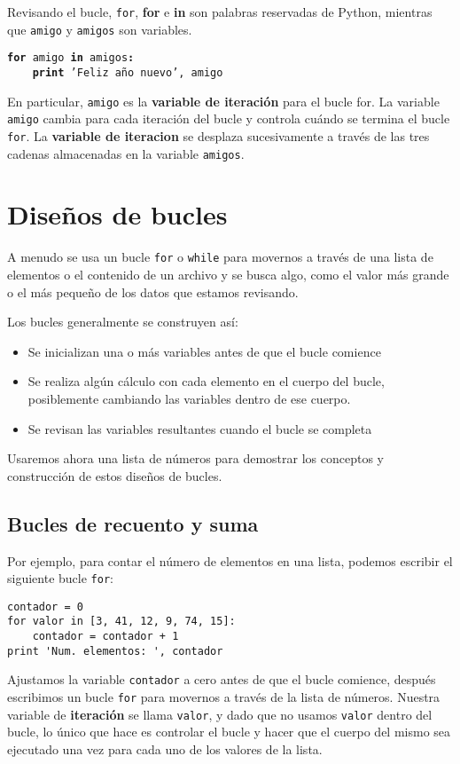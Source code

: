 Revisando el bucle, {\tt for}, {\bf for} e {\bf in} son palabras
reservadas de Python, mientras que {\tt amigo} y {\tt amigos} son variables.

{\tt {\bf for} amigo {\bf in} amigos{\bf :}\\
\verb"    "{\bf print} 'Feliz año nuevo', amigo }

En particular, {\tt amigo} es la {\bf variable de iteración} para
el bucle for. La variable {\tt amigo} cambia para cada iteración del
bucle y controla cuándo se termina el bucle {\tt for}. La
{\bf variable de iteracion} se desplaza sucesivamente a través de
las tres cadenas almacenadas en la variable {\tt amigos}.


\section{Diseños de bucles}

A menudo se usa un bucle {\tt for} o {\tt while} para movernos a través de una lista de elementos
o el contenido de un archivo y se busca algo, como el valor
más grande o el más pequeño de los datos que estamos revisando.

Los bucles generalmente se construyen así:

\begin{itemize}

\item Se inicializan una o más variables antes de que el bucle comience

\item Se realiza algún cálculo con cada elemento en el cuerpo del bucle,
posiblemente cambiando las variables dentro de ese cuerpo.

\item Se revisan las variables resultantes cuando el bucle se completa

\end{itemize}

Usaremos ahora una lista de números para demostrar los conceptos y construcción
de estos diseños de bucles.

\subsection{Bucles de recuento y suma}

Por ejemplo, para contar el número de elementos
en una lista, podemos escribir el siguiente bucle {\tt for}:

\beforeverb
\begin{verbatim}
contador = 0
for valor in [3, 41, 12, 9, 74, 15]:
    contador = contador + 1
print 'Num. elementos: ', contador
\end{verbatim}
\afterverb
%
Ajustamos la variable {\tt contador} a cero antes de que el bucle comience,
después escribimos un bucle {\tt for} para movernos a través de la lista de números.
Nuestra variable de {\bf iteración} se llama {\tt valor}, y dado que no
usamos {\tt valor} dentro del bucle, lo único que hace es controlar el bucle
y hacer que el cuerpo del mismo sea ejecutado una vez para cada uno de los
valores de la lista.

